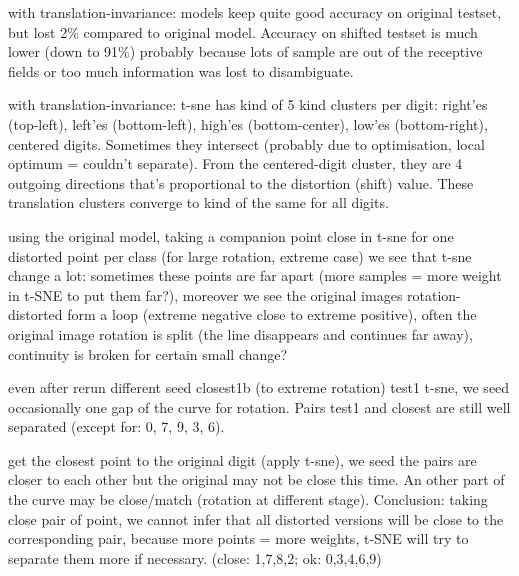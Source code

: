 \documentclass[a4paper,12pt]{article}
\begin{document}
with translation-invariance: models keep quite good accuracy on original testset, but lost 2\% compared to original model. Accuracy on shifted testset is much lower (down to 91\%) probably because lots of sample are out of the receptive fields or too much information was lost to disambiguate.

with translation-invariance: t-sne has kind of 5 kind clusters per digit: right'es (top-left), left'es (bottom-left), high'es (bottom-center), low'es (bottom-right), centered digits. Sometimes they intersect (probably due to optimisation, local optimum = couldn't separate). From the centered-digit cluster, they are 4 outgoing directions that's proportional to the distortion (shift) value. These translation clusters converge to kind of the same for all digits.

using the original model, taking a companion point close in t-sne for one distorted point per class (for large rotation, extreme case) we see that t-sne change a lot: sometimes these points are far apart (more samples = more weight in t-SNE to put them far?), moreover we see the original images rotation-distorted form a loop (extreme negative close to extreme positive), often the original image rotation is split (the line disappears and continues far away), continuity is broken for certain small change?

even after rerun different seed closest1b (to extreme rotation) test1 t-sne, we seed occasionally one gap of the curve for rotation. Pairs test1 and closest are still well separated (except for: 0, 7, 9, 3, 6).

get the closest point to the original digit (apply t-sne), we seed the pairs are closer to each other but the original may not be close this time. An other part of the curve may be close/match (rotation at different stage). Conclusion: taking close pair of point, we cannot infer that all distorted versions will be close to the corresponding pair, because more points = more weights, t-SNE will try to separate them more if necessary. (close: 1,7,8,2; ok: 0,3,4,6,9)
\end{document}
